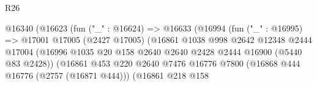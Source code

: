 \begin{lexlean}{R26}
\begin{coremodule}
                                              @16340
                                                (@16623
                                                  (fun ("_" : @16624) =>
                                                  @16633
                                                    (@16994
                                                      (fun ("_" : @16995) =>
                                                      @17001
                                                        @17005
                                                        (@2427 @17005)
                                                        (@16861
                                                          @1038
                                                          @998
                                                          @2642
                                                          @12348
                                                          @2444
                                                          @17004
                                                          (@16996
                                                            @1035
                                                            @20
                                                            @158
                                                            @2640
                                                            @2640
                                                            @2428
                                                            @2444
                                                            @16900
                                                            (@5440 @83 @2428))
                                                          (@16861
                                                            @453
                                                            @220
                                                            @2640
                                                            @7476
                                                            @16776
                                                            @7800
                                                            (@16868
                                                              @444
                                                              @16776
                                                              (@2757 (@16871 @444)))
                                                            (@16861
                                                              @218
                                                              @158

\end{coremodule}
\end{lexlean}
